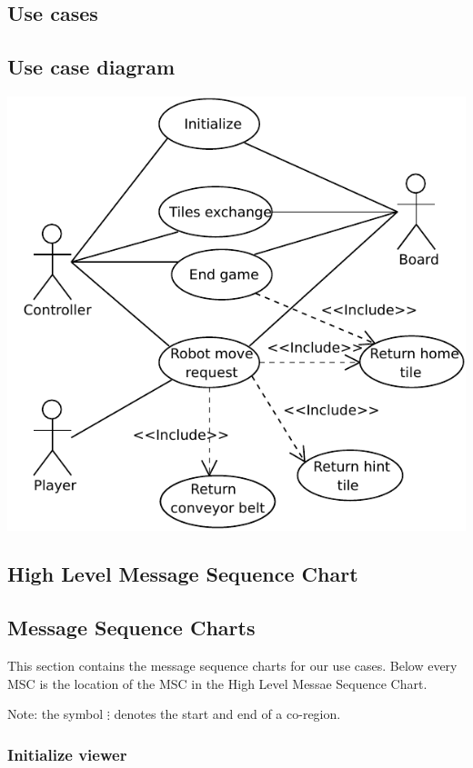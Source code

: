 \subsection{Use cases}
	
\subsection{Use case diagram}
	\includegraphics[width=\linewidth]{usecases/diagram.pdf}	

\subsection{High Level Message Sequence Chart}
	
	
	
\subsection{Message Sequence Charts}
	This section contains the message sequence charts for our use cases. Below every MSC is the location of the MSC in the High Level Messae Sequence Chart.

	Note: the symbol $\vdots$ denotes the start and end of a co-region.

    \subsubsection{Initialize viewer}
    

